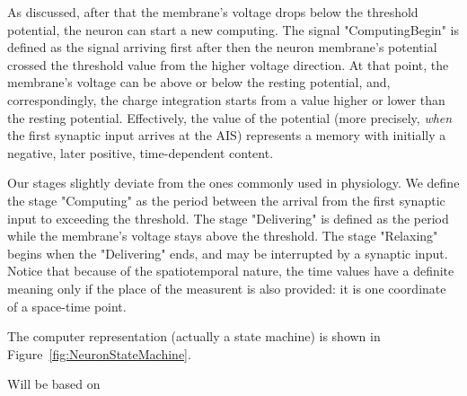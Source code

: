 As discussed, after that the membrane's voltage drops below the threshold potential,
the neuron can start a new computing.
The signal "ComputingBegin" is defined as the signal arriving first after then
the neuron membrane's potential crossed the threshold value from the higher voltage direction.
At that point, the membrane's voltage can be above or below the resting potential,
and, correspondingly, the charge integration starts from a value higher or lower than the resting potential.
Effectively, the value of the potential (more precisely, \textit{when} the first
synaptic input arrives at the \gls{AIS}) represents a memory with initially a negative, later positive, time-dependent content.
%

Our stages slightly deviate from the ones commonly used in physiology.
We define the stage "Computing" as the period between the arrival from the first synaptic input
to exceeding the threshold.
The stage "Delivering" is defined as the period while the membrane's voltage stays above the threshold.
The stage "Relaxing" begins when the "Delivering" ends, and may be interrupted by a synaptic input.
Notice that because of the spatiotemporal nature, the time values have a definite meaning only
if the place of the measurent is also provided: it is one coordinate of a space-time point.







The computer representation (actually a state machine) is shown in Figure~\ref{fig:NeuronStateMachine}.                          


Will be based on \cite{VeghComputingModel:2021} \cite{VeghRevisingClassicComputing:2021}
